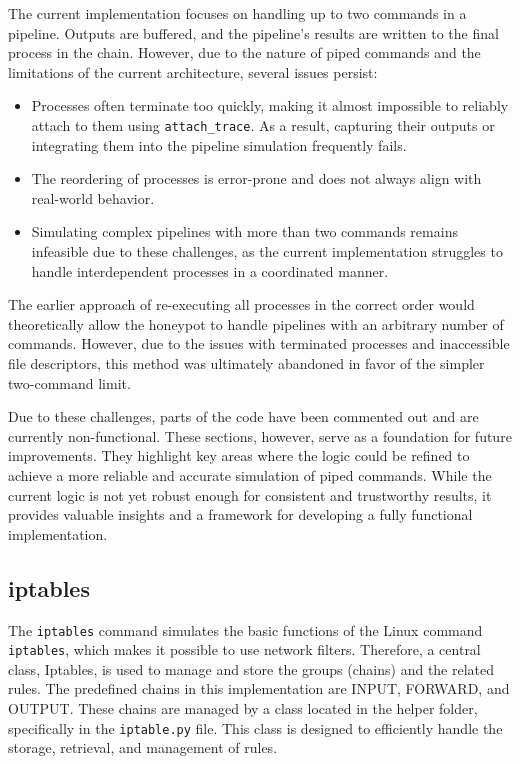 The current implementation focuses on handling up to two commands in a pipeline. Outputs are buffered, and the pipeline's results are written to the final process in the chain. However, due to the nature of piped commands and the limitations of the current architecture, several issues persist:

\begin{itemize}
    \item Processes often terminate too quickly, making it almost impossible to reliably attach to them using \texttt{attach\_trace}. As a result, capturing their outputs or integrating them into the pipeline simulation frequently fails.
    \item The reordering of processes is error-prone and does not always align with real-world behavior.
    \item Simulating complex pipelines with more than two commands remains infeasible due to these challenges, as the current implementation struggles to handle interdependent processes in a coordinated manner.
\end{itemize}

The earlier approach of re-executing all processes in the correct order would theoretically allow the honeypot to handle pipelines with an arbitrary number of commands. However, due to the issues with terminated processes and inaccessible file descriptors, this method was ultimately abandoned in favor of the simpler two-command limit.

Due to these challenges, parts of the code have been commented out and are currently non-functional. These sections, however, serve as a foundation for future improvements. They highlight key areas where the logic could be refined to achieve a more reliable and accurate simulation of piped commands. While the current logic is not yet robust enough for consistent and trustworthy results, it provides valuable insights and a framework for developing a fully functional implementation.

\subsection{iptables}
\label{sub:iptables}

The \texttt{iptables} command simulates the basic functions of the Linux command \texttt{iptables}, which makes it possible to use network filters. Therefore, a central class, Iptables, is used to manage and store the groups (chains) and the related rules. The predefined chains in this implementation are INPUT, FORWARD, and OUTPUT. These chains are managed by a class located in the helper folder, specifically in the \texttt{iptable.py} file. This class is designed to efficiently handle the storage, retrieval, and management of rules.

